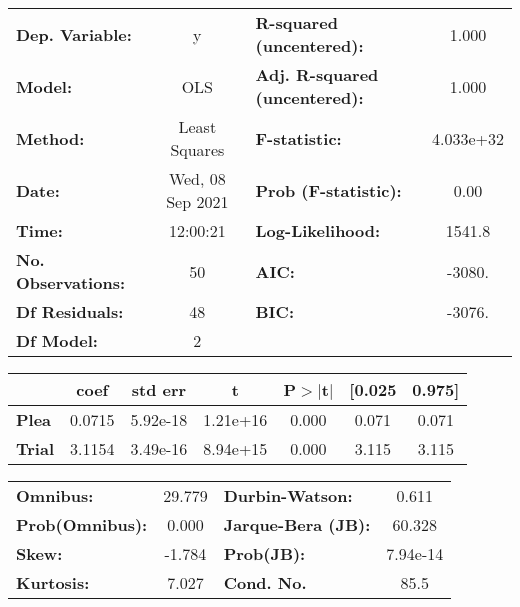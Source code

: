 \begin{center}
\begin{tabular}{lclc}
\toprule
\textbf{Dep. Variable:}    &        y         & \textbf{  R-squared (uncentered):}      &     1.000   \\
\textbf{Model:}            &       OLS        & \textbf{  Adj. R-squared (uncentered):} &     1.000   \\
\textbf{Method:}           &  Least Squares   & \textbf{  F-statistic:       }          & 4.033e+32   \\
\textbf{Date:}             & Wed, 08 Sep 2021 & \textbf{  Prob (F-statistic):}          &     0.00    \\
\textbf{Time:}             &     12:00:21     & \textbf{  Log-Likelihood:    }          &    1541.8   \\
\textbf{No. Observations:} &          50      & \textbf{  AIC:               }          &    -3080.   \\
\textbf{Df Residuals:}     &          48      & \textbf{  BIC:               }          &    -3076.   \\
\textbf{Df Model:}         &           2      & \textbf{                     }          &             \\
\bottomrule
\end{tabular}
\begin{tabular}{lcccccc}
               & \textbf{coef} & \textbf{std err} & \textbf{t} & \textbf{P$> |$t$|$} & \textbf{[0.025} & \textbf{0.975]}  \\
\midrule
\textbf{Plea}  &       0.0715  &     5.92e-18     &  1.21e+16  &         0.000        &        0.071    &        0.071     \\
\textbf{Trial} &       3.1154  &     3.49e-16     &  8.94e+15  &         0.000        &        3.115    &        3.115     \\
\bottomrule
\end{tabular}
\begin{tabular}{lclc}
\textbf{Omnibus:}       & 29.779 & \textbf{  Durbin-Watson:     } &    0.611  \\
\textbf{Prob(Omnibus):} &  0.000 & \textbf{  Jarque-Bera (JB):  } &   60.328  \\
\textbf{Skew:}          & -1.784 & \textbf{  Prob(JB):          } & 7.94e-14  \\
\textbf{Kurtosis:}      &  7.027 & \textbf{  Cond. No.          } &     85.5  \\
\bottomrule
\end{tabular}
\end{center}
